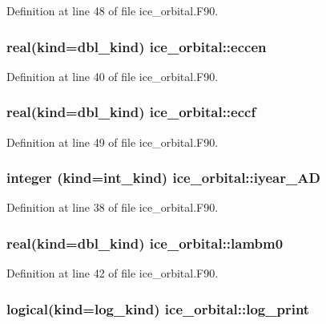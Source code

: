 Definition at line 48 of file ice\_\-orbital.F90.\hypertarget{namespaceice__orbital_a24946bf121e343b1a874b8ca4f5cd700}{
\subsubsection[{eccen}]{\setlength{\rightskip}{0pt plus 5cm}real(kind=dbl\_\-kind) {\bf ice\_\-orbital::eccen}}}
\label{namespaceice__orbital_a24946bf121e343b1a874b8ca4f5cd700}


Definition at line 40 of file ice\_\-orbital.F90.\hypertarget{namespaceice__orbital_a01d96908c345645e4dd439536e32eaba}{
\subsubsection[{eccf}]{\setlength{\rightskip}{0pt plus 5cm}real(kind=dbl\_\-kind) {\bf ice\_\-orbital::eccf}}}
\label{namespaceice__orbital_a01d96908c345645e4dd439536e32eaba}


Definition at line 49 of file ice\_\-orbital.F90.\hypertarget{namespaceice__orbital_adb48d087f6d15eae3b858c4347ae2da3}{
\subsubsection[{iyear\_\-AD}]{\setlength{\rightskip}{0pt plus 5cm}integer (kind=int\_\-kind) {\bf ice\_\-orbital::iyear\_\-AD}}}
\label{namespaceice__orbital_adb48d087f6d15eae3b858c4347ae2da3}


Definition at line 38 of file ice\_\-orbital.F90.\hypertarget{namespaceice__orbital_aecd1e54c58dfa1c5f8c3c01250020047}{
\subsubsection[{lambm0}]{\setlength{\rightskip}{0pt plus 5cm}real(kind=dbl\_\-kind) {\bf ice\_\-orbital::lambm0}}}
\label{namespaceice__orbital_aecd1e54c58dfa1c5f8c3c01250020047}


Definition at line 42 of file ice\_\-orbital.F90.\hypertarget{namespaceice__orbital_a1b10ff11977a2b2d6c6d830897a29597}{
\subsubsection[{log\_\-print}]{\setlength{\rightskip}{0pt plus 5cm}logical(kind=log\_\-kind) {\bf ice\_\-orbital::log\_\-print}}}
\label{namespaceice__orbital_a1b10ff11977a2b2d6c6d830897a29597}


